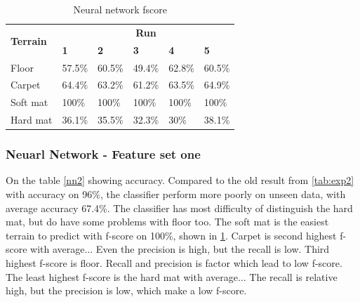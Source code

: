 \documentclass[USenglish]{ifimaster}  %
\begin{document}
\begin{table}[h]
	\centering
	\begin{tabular}{@{}llllll@{}}
		\toprule
		\multirow{2}{*}{\textbf{Terrain}} & \multicolumn{5}{c}{\textbf{Run}} \\ \cmidrule(l){2-6} 
		& \multicolumn{1}{l|}{\textbf{1}} & \multicolumn{1}{l|}{\textbf{2}} & \multicolumn{1}{l|}{\textbf{3}} & \multicolumn{1}{l|}{\textbf{4}} & \textbf{5} \\ \midrule
		\multicolumn{1}{l|}{Floor} & \multicolumn{1}{l|}{57.5\%} & \multicolumn{1}{l|}{60.5\%} & \multicolumn{1}{l|}{49.4\%} & \multicolumn{1}{l|}{62.8\%} & 60.5\% \\ \midrule
		\multicolumn{1}{l|}{Carpet} & \multicolumn{1}{l|}{64.4\%} & \multicolumn{1}{l|}{63.2\%} & \multicolumn{1}{l|}{61.2\%} & \multicolumn{1}{l|}{63.5\%} & 64.9\% \\ \midrule
		\multicolumn{1}{l|}{Soft mat} & \multicolumn{1}{l|}{100\%} & \multicolumn{1}{l|}{100\%} & \multicolumn{1}{l|}{100\%} & \multicolumn{1}{l|}{100\%} & 100\% \\ \midrule
		\multicolumn{1}{l|}{Hard mat} & \multicolumn{1}{l|}{36.1\%} & \multicolumn{1}{l|}{35.5\%} & \multicolumn{1}{l|}{32.3\%} & \multicolumn{1}{l|}{30\%} & 38.1\% \\ \bottomrule
	\end{tabular}
	\caption{Neural network fscore}
	\label{nnfscore}
\end{table}
\FloatBarrier

\subsubsection{Neuarl Network - Feature set one}
On the table \ref{nn2} showing accuracy. Compared to the old result from \ref{tab:exp2} with accuracy on 96\%, the classifier perform more poorly on unseen data, with average accuracy 67.4\%. The classifier has most difficulty of distinguish the hard mat, but do have some problems with floor too. The soft mat is the easiest terrain to predict with f-score on 100\%, shown in \ref{nnfscore}. Carpet is second highest f-score with average... Even the precision is high, but the recall is low. Third highest f-score is floor. Recall and precision is factor which lead to low f-score. The least highest f-score is the hard mat with average... The recall is relative high, but the precision is low, which make a low f-score.
\end{document}
